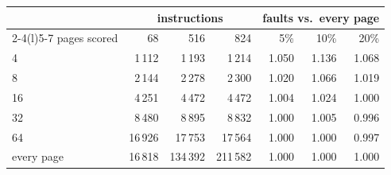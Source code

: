 \begin{tabular}{lrrrrrr}
\toprule
 & \multicolumn{3}{c}{instructions} & \multicolumn{3}{c}{faults vs.\ every page} \\
\cmidrule(lr){2-4}\cmidrule(l){5-7}
pages scored & 68 & 516 & 824 & 5\% & 10\% & 20\% \\
\midrule
4 & 1\,112 & 1\,193 & 1\,214 & 1.050 & 1.136 & 1.068 \\
8 & 2\,144 & 2\,278 & 2\,300 & 1.020 & 1.066 & 1.019 \\
16 & 4\,251 & 4\,472 & 4\,472 & 1.004 & 1.024 & 1.000 \\
32 & 8\,480 & 8\,895 & 8\,832 & 1.000 & 1.005 & 0.996 \\
64 & 16\,926 & 17\,753 & 17\,564 & 1.000 & 1.000 & 0.997 \\
every page & 16\,818 & 134\,392 & 211\,582 & 1.000 & 1.000 & 1.000 \\
\bottomrule
\end{tabular}
